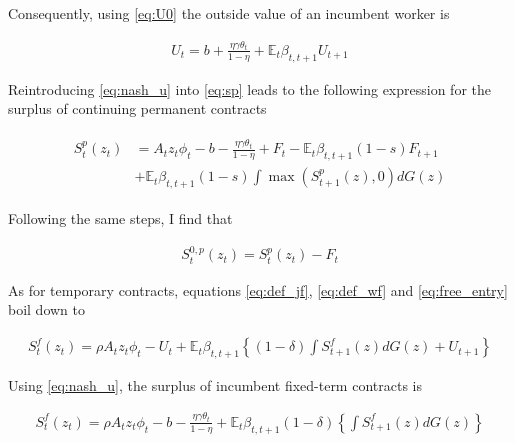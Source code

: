 Consequently, using \eqref{eq:U0} the outside value of an incumbent worker is

\begin{align}
U_t = b + \frac{\eta \gamma \theta_{t}}{1-\eta} + \mathbb{E}_t \beta_{t,t+1} U_{t+1} \label{eq:nash_u}
\end{align}

Reintroducing \eqref{eq:nash_u} into \eqref{eq:sp} leads to the following expression for the surplus of continuing permanent contracts

\begin{align}
\begin{split}
S_t^p \left( z_t \right) &= A_t z_t \phi_t - b - \frac{\eta \gamma \theta_{t}}{1-\eta} + F_t - \mathbb{E}_t \beta_{t,t+1} (1-s) F_{t+1}\\
&+ \mathbb{E}_t  \beta_{t,t+1} (1-s) \int \max \left( S_{t+1}^p (z), 0 \right) dG(z)
\end{split}
\end{align}

Following the same steps, I find that

\begin{align}
S_t^{0,p} \left( z_t \right) = S_t^p \left( z_t \right) - F_t
\end{align}

As for temporary contracts, equations \eqref{eq:def_jf}, \eqref{eq:def_wf} and \eqref{eq:free_entry} boil down to

\begin{align}
S_t^f \left( z_t \right) = \rho A_t z_t \phi_t - U_t + \mathbb{E}_t \beta_{t,t+1} \left\{ (1-\delta) \int S_{t+1}^f (z) dG(z) + U_{t+1} \right\}
\end{align} 

Using \eqref{eq:nash_u}, the surplus of incumbent fixed-term contracts is

\begin{align}
S_t^f \left( z_t \right) = \rho A_t z_t \phi_t - b - \frac{\eta \gamma \theta_{t}}{1-\eta} + \mathbb{E}_t \beta_{t,t+1} (1-\delta) \left\{  \int S_{t+1}^f (z) dG(z) \right\} 
\end{align}

